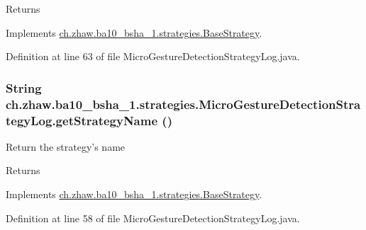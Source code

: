 \begin{DoxyReturn}{Returns}

\end{DoxyReturn}


Implements \hyperlink{classch_1_1zhaw_1_1ba10__bsha__1_1_1strategies_1_1BaseStrategy_a75fdb36932ad701f6375cc1fe718056b}{ch.zhaw.ba10\_\-bsha\_\-1.strategies.BaseStrategy}.

Definition at line 63 of file MicroGestureDetectionStrategyLog.java.\hypertarget{classch_1_1zhaw_1_1ba10__bsha__1_1_1strategies_1_1MicroGestureDetectionStrategyLog_a29210917e83b9e7d54635993300f8923}{
\subsubsection[{getStrategyName}]{\setlength{\rightskip}{0pt plus 5cm}String ch.zhaw.ba10\_\-bsha\_\-1.strategies.MicroGestureDetectionStrategyLog.getStrategyName ()}}
\label{classch_1_1zhaw_1_1ba10__bsha__1_1_1strategies_1_1MicroGestureDetectionStrategyLog_a29210917e83b9e7d54635993300f8923}
Return the strategy's name

\begin{DoxyReturn}{Returns}

\end{DoxyReturn}


Implements \hyperlink{classch_1_1zhaw_1_1ba10__bsha__1_1_1strategies_1_1BaseStrategy_aa0ebed55eed45409bad13d43a0058780}{ch.zhaw.ba10\_\-bsha\_\-1.strategies.BaseStrategy}.

Definition at line 58 of file MicroGestureDetectionStrategyLog.java.

